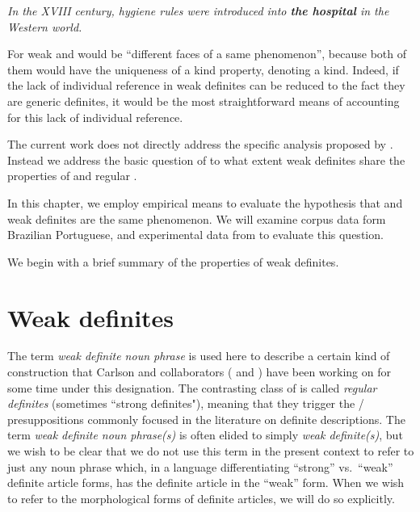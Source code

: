 \documentclass[output=paper,
modfonts
]{langscibook}
\begin{document}
\ea \label{ex:desaetal:3}
\textit{In the XVIII century, hygiene rules were introduced into \textbf{the hospital} in the Western world.}
\z 

For \citet[193]{Aguilar-GuevaraZwarsts2011} weak and  would be “different faces of a same phenomenon”, because both of them would have the uniqueness of a kind property, denoting a kind.  Indeed, if the lack of individual reference in weak definites can be reduced to the fact they are generic definites, it would be the most straightforward means of accounting for this lack of individual reference. 

The current work does not directly address the specific analysis proposed by \citet{Aguilar-GuevaraZwarsts2011}. Instead we address the basic question of to what extent weak definites share the properties of  and regular .
 
In this chapter, we employ empirical means to evaluate the hypothesis that  and weak definites are the same phenomenon. We will examine corpus data form Brazilian Portuguese, and experimental data from  to evaluate this question.

We begin with a brief summary of the properties of weak definites.


\section{Weak definites} \label{sec:desaetal:2}

The term \textit{weak definite noun phrase} is used here to describe a certain kind of construction that Carlson and collaborators (\citealt{CarlsonSussman2005,CarlsonEtAlii2006,CarlsonEtAlii2013} and \citealt{KleinEtAlii2013})
have been working on for some time under this designation. The contrasting class of  is called \textit{regular definites} (sometimes “strong definites"), meaning that they trigger the / presuppositions commonly focused in the literature on definite descriptions. The term \textit{weak definite noun phrase(s)} is often elided to simply \textit{weak definite(s)}, but we wish to be clear that we do not use this term in the present context to refer to just any noun phrase which, in a language differentiating “strong” vs.\ “weak” definite article forms, has the definite article in the “weak” form.  When we wish to refer to the morphological forms of definite articles, we will do so explicitly.
\end{document}
